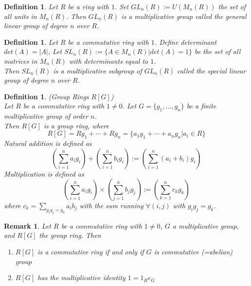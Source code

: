 \documentclass[a4paper,8pt]{article}
\newcommand{\hlt}[1]{\textit{{\color{blue}#1}}}
\theoremstyle{theorem}
\newtheorem{definition}[theorem]{Definition}
\newtheorem{remark}[theorem]{Remark}
\begin{document}
\begin{definition}
Let $R$ be a ring with $1$. Set $GL_n(R) := U(M_n(R))$ the set of all units in $M_n(R)$. Then $GL_n(R)$ is a multiplicative group called the \hlt{general linear group of degree $n$ over $R$}.
\end{definition}


\begin{definition}
Let $R$ be a commutative ring with $1$. Define determinant $det(A) = \left| A \right|$, Let $SL_n(R) := \{A \in M_n(R) | det(A) = 1\}$ be the set of all matrices in $M_n(R)$ with determinants equal to $1$. \\
Then $SL_n(R)$ is a multiplicative subgroup of $GL_n(R)$ called the \hlt{special linear group of degree $n$ over $R$}.
\end{definition}


\begin{definition}
\hlt{(Group Rings $R[G]$)}\\
Let $R$	be a commutative ring with $1 \neq 0$. Let $G = \{g_1, \ldots, g_n\}$ be a finite multiplicative group of order $n$.\\
Then $R[G]$ is a \hlt{group ring}, where 
\begin{equation}
R[G] = Rg_1 + \cdots + Rg_n = \{a_1 g_1 + \cdots + a_n g_n | a_i \in R\} \nonumber	
\end{equation}
Natural addition is defined as 
\begin{equation}
(\sum_{i=1}^{n} a_i g_i)+ (\sum_{i=1}^{n} b_i g_i) := (\sum_{i=1}^{n} (a_i + b_i) g_i) \nonumber
\end{equation}
Multiplication is defined as 
\begin{equation}
(\sum_{i=1}^{n} a_i g_i) \times (\sum_{j=1}^{n} b_j g_j) := (\sum_{k=1}^{n} c_k g_k) \nonumber
\end{equation}
where $c_k=\sum_{g_i g_j = g_k} a_i b_j$ with the sum running $\forall (i, j)$ with $g_i g_j = g_k$.\\
\end{definition}


\begin{remark}
Let $R$ be a commutative ring with $1 \neq 0$, $G$ a multiplicative group, and $R[G]$ the group ring. Then
\begin{enumerate}[label=(\roman*)]
\item $R[G]$ is a commutative ring if and only if $G$ is commutative (=abelian) group
\item $R[G]$ has the multiplicative identity $1=1_R e_G$
\end{enumerate}
\end{remark}
\end{document}
